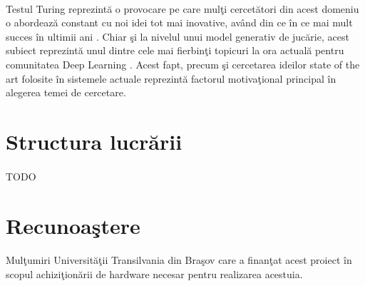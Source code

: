 \paragraph{}
Testul Turing reprezint\u a o provocare pe care mul\c ti cercet\u atori din acest domeniu o abordeaz\u a constant cu noi idei tot mai inovative, av\^ and din ce \^ in ce mai mult succes \^ in ultimii ani \cite{turing-test-succes}. Chiar \c si la nivelul unui model generativ de juc\u arie, acest subiect reprezint\u a unul dintre cele mai fierbin\c ti topicuri la ora actual\u a pentru comunitatea Deep Learning \cite{deep-learning-turing-test}. Acest fapt, precum \c si cercetarea ideilor state of the art folosite \^ in sistemele actuale reprezint\u a factorul motiva\c tional principal \^ in alegerea temei de cercetare.

\section{Structura lucr\u arii}

\paragraph{}
TODO


\section{Recunoa\c stere}

\paragraph{}
Mul\c tumiri Universit\u a\c tii Transilvania din Bra\c sov care a finan\c tat acest proiect \^ in scopul achizi\c tion\u arii de hardware necesar pentru realizarea acestuia.